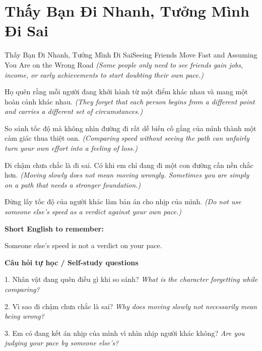 \section{Thấy Bạn Đi Nhanh, Tưởng Mình Đi Sai}
\begin{truyen}{Thấy Bạn Đi Nhanh, Tưởng Mình Đi Sai}{Seeing Friends Move Fast and Assuming You Are on the Wrong Road}
\textit{(Some people only need to see friends gain jobs, income, or early achievements to start doubting their own pace.)}

Họ quên rằng mỗi người đang khởi hành từ một điểm khác nhau và mang một hoàn cảnh khác nhau.
\textit{(They forget that each person begins from a different point and carries a different set of circumstances.)}

So sánh tốc độ mà không nhìn đường đi rất dễ biến cố gắng của mình thành một cảm giác thua thiệt oan.
\textit{(Comparing speed without seeing the path can unfairly turn your own effort into a feeling of loss.)}

Đi chậm chưa chắc là đi sai. Có khi em chỉ đang đi một con đường cần nền chắc hơn.
\textit{(Moving slowly does not mean moving wrongly. Sometimes you are simply on a path that needs a stronger foundation.)}

\end{truyen}

\begin{baihoc}
Đừng lấy tốc độ của người khác làm bản án cho nhịp của mình.
\textit{(Do not use someone else's speed as a verdict against your own pace.)}
\end{baihoc}

\begin{ghinhoanh}
\textbf{Short English to remember:}

Someone else's speed is not a verdict on your pace.

\end{ghinhoanh}

\begin{tuhocnhanh}
\textbf{Câu hỏi tự học / Self-study questions}

1. Nhân vật đang quên điều gì khi so sánh? \textit{What is the character forgetting while comparing?}

2. Vì sao đi chậm chưa chắc là sai? \textit{Why does moving slowly not necessarily mean being wrong?}

3. Em có đang kết án nhịp của mình vì nhìn nhịp người khác không? \textit{Are you judging your pace by someone else's?}
\end{tuhocnhanh}
\ngancach

